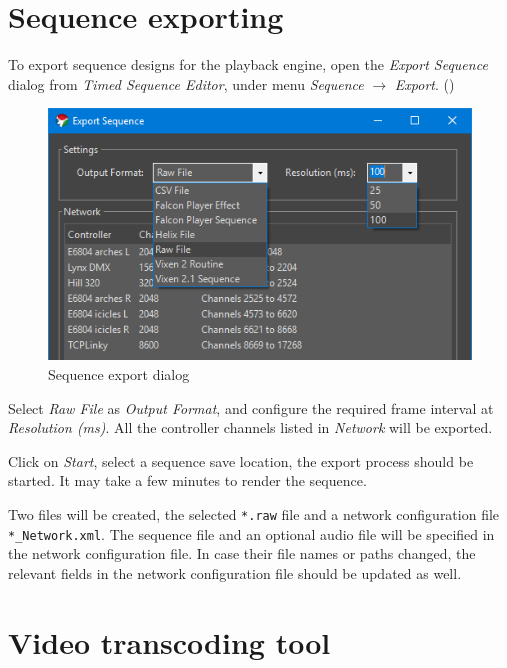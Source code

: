 \renewcommand{\baselinestretch}{\mystretch}
\label{chap:Guide}

\section{Sequence exporting}

To export sequence designs for the playback engine, open the \textit{Export Sequence} dialog from \textit{Timed Sequence Editor}, under menu \textit{Sequence} $\rightarrow$ \textit{Export}. ()

\begin{figure}[!htb]
  \centering
  \includegraphics[width=0.75\columnwidth]{Figs/vixen_export.png}
  \caption{\footnotesize Sequence export dialog}
  \label{fig:guide_export}
\end{figure}

Select \textit{Raw File} as \textit{Output Format}, and configure the required frame interval at \textit{Resolution (ms)}. All the controller channels listed in \textit{Network} will be exported.

Click on \textit{Start}, select a sequence save location, the export process should be started. It may take a few minutes to render the sequence.

Two files will be created, the selected \texttt{*.raw} file and a network configuration file \texttt{*\_Network.xml}. The sequence file and an optional audio file will be specified in the network configuration file. In case their file names or paths changed, the relevant fields in the network configuration file should be updated as well.

\section{Video transcoding tool}

